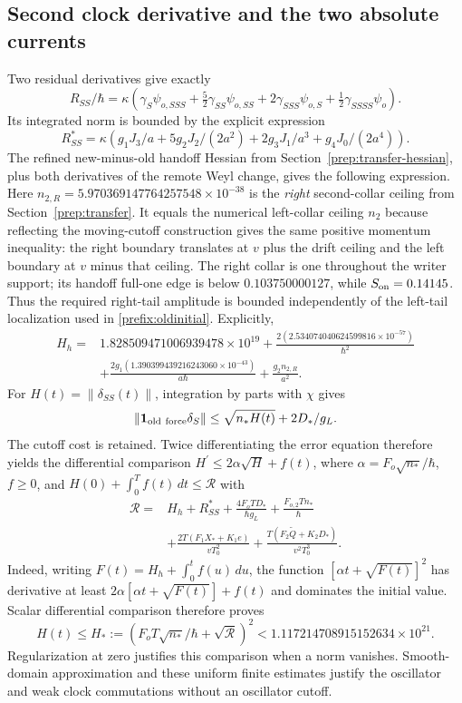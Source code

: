 \documentclass[11pt]{article}
\theoremstyle{definition}\newtheorem{definition}[theorem]{Definition}
\theoremstyle{remark}\newtheorem{remark}[theorem]{Remark}
\begin{document}
\subsection{Second clock derivative and the two absolute currents}
\label{prefix:currents}
Two residual derivatives give exactly
\[
 R_{SS}/\hbar=\kappa\left(
 \gamma_S\psi_{o,SSS}+\tfrac52\gamma_{SS}\psi_{o,SS}
       +2\gamma_{SSS}\psi_{o,S}+\tfrac12\gamma_{SSSS}\psi_o\right).
\]
Its integrated norm is bounded by the explicit expression
\[
 R_{SS}^*=\kappa(g_1J_3/a+5g_2J_2/(2a^2)
                      +2g_3J_1/a^3+g_4J_0/(2a^4)).
\]
The refined new-minus-old handoff Hessian from
Section~\ref{prep:transfer-hessian}, plus both derivatives of the
remote Weyl change, gives the following expression.
Here $n_{2,R}=5.970369147764257548\times10^{-38}$ is the
\emph{right} second-collar ceiling from Section~\ref{prep:transfer}.
It equals the numerical left-collar ceiling $n_2$ because reflecting
the moving-cutoff construction gives the same positive momentum
inequality: the right boundary translates at $v$ plus the drift ceiling
and the left boundary at $v$ minus that ceiling.  The right collar is
one throughout the writer support; its handoff full-one edge is below
$0.103750000127$, while $S_{\rm on}=0.14145$.
Thus the required right-tail amplitude is bounded independently of the
left-tail localization used in \eqref{prefix:oldinitial}.  Explicitly,
\begin{align}
 H_h={}&1.828509471006939478\times10^{19}
       +\frac{2(2.534074040624599816\times10^{-57})}{\hbar^2}
       \nonumber\\
 &+\frac{2g_1(1.390399439216243060\times10^{-43})}{a\hbar}
                       +\frac{g_2n_{2,R}}{a^2}.
 \label{prefix:Hh}
\end{align}
For $H(t)=\|\delta_{SS}(t)\|$, integration by parts with $\chi$ gives
\[
 \|\mathbf1_{\rm old\ force}\delta_S\|
             \le\sqrt{n_*H(t)}+2D_*/g_L.
\]
The cutoff cost is retained.  Twice differentiating the error equation
therefore yields the differential comparison
$H^\prime\le 2\alpha\sqrt H+f(t)$, where
$\alpha=F_o\sqrt{n_*}/\hbar$, $f\ge0$, and
$H(0)+\int_0^T f(t)\,dt\le\mathcal R$ with
\begin{align}
 \mathcal R={}&H_h+R_{SS}^*
       +\frac{4F_oTD_*}{\hbar g_L}
       +\frac{F_{o,2}Tn_*}{\hbar}\nonumber\\
 &+\frac{2T(F_1X_*+K_1e)}{vT_0^2}
       +\frac{T(F_2\widetilde Q+K_2D_*)}{v^2T_0^3}.
 \label{prefix:Hrest}
\end{align}
Indeed, writing $F(t)=H_h+\int_0^t f(u)\,du$,
the function $[\alpha t+\sqrt{F(t)}]^2$ has derivative at least
$2\alpha[\alpha t+\sqrt{F(t)}]+f(t)$ and dominates the initial
value.  Scalar differential comparison therefore proves
\begin{equation}
 H(t)\le H_*:=\left(F_oT\sqrt{n_*}/\hbar+\sqrt{\mathcal R}\right)^2
 <1.117214708915152634\times10^{21}.
 \label{prefix:H}
\end{equation}
Regularization at zero justifies this comparison when a norm vanishes.
Smooth-domain approximation and
these uniform finite estimates justify the oscillator and weak clock
commutations without an oscillator cutoff.
\end{document}
